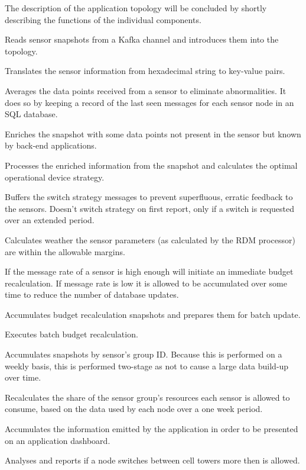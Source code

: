 The description of the application topology will be concluded by shortly describing the functions of the individual components.
\begin{description}[style=nextline]
\nospace
\item[Sensit spout] Reads sensor snapshots from a Kafka channel and introduces them into the topology.
\item[Translator] Translates the sensor information from hexadecimal string to key-value pairs.
\item[Nuancer] Averages the data points received from a sensor to eliminate abnormalities. It does so by keeping a record of the last seen messages for each sensor node in an SQL database.
\item[Attributor] Enriches the snapshot with some data points not present in the sensor but known by  back-end applications.
\item[Sensor RDM processor] Processes the enriched information from the snapshot and calculates the optimal operational device strategy.
\item[Switch strategy buffer] Buffers the switch strategy messages to prevent superfluous, erratic feedback to the sensors. Doesn't switch strategy on first report, only if a switch is requested over an extended period.
\item[Single message analyser] Calculates weather the sensor parameters (as calculated by the RDM processor) are within the allowable margins.
\item[Budget recalculator interface]If the message rate of a sensor is high enough will initiate an immediate budget recalculation. If message rate is low it is allowed to be accumulated over some time to reduce the number of database updates.
\item[Budget recalculator accumulator] Accumulates budget recalculation snapshots and prepares them  for batch update.
\item[Budget recalculator] Executes batch budget recalculation.
\item[Group accumulator] Accumulates snapshots by sensor's group ID. Because this is performed on a weekly basis, this is performed two-stage as not to cause a large data build-up over time.
\item[Group share recalculator] Recalculates the share of the sensor group's resources each sensor is allowed to consume, based on the data used by each node over a one week period.
\item[Application accumulator] Accumulates the information emitted by the application in order to be presented on an application dashboard.
\item[Cell Switch Analyser] Analyses and reports if a node switches between cell towers more then is allowed.
\end{description}

